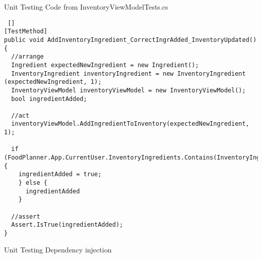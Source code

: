 \begin{frame} [fragile] {Unit Testing} {Code from InventoryViewModelTests.cs}

\begin{lstlisting} []
[TestMethod]
public void AddInventoryIngredient_CorrectIngrAdded_InventoryUpdated() {
  //arrange
  Ingredient expectedNewIngredient = new Ingredient();
  InventoryIngredient inventoryIngredient = new InventoryIngredient (expectedNewIngredient, 1);
  InventoryViewModel inventoryViewModel = new InventoryViewModel();
  bool ingredientAdded;
  
  //act
  inventoryViewModel.AddIngredientToInventory(expectedNewIngredient, 1);
  
  if (FoodPlanner.App.CurrentUser.InventoryIngredients.Contains(InventoryIngredient)) {
    ingredientAdded = true;
    } else {
      ingredientAdded
    }
    
  //assert
  Assert.IsTrue(ingredientAdded);
}
\end{lstlisting}

\end{frame}

\begin{frame} {Unit Testing} {Dependency injection}

\end{frame}
